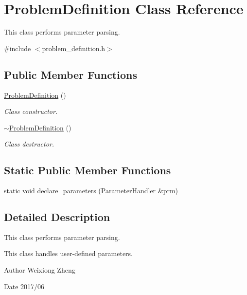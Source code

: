 \hypertarget{class_problem_definition}{}\section{Problem\+Definition Class Reference}
\label{class_problem_definition}


This class performs parameter parsing.  




{\ttfamily \#include $<$problem\+\_\+definition.\+h$>$}

\subsection*{Public Member Functions}
\begin{DoxyCompactItemize}
\item 
\hyperlink{class_problem_definition_ad5d05724dd7de8e362f0c8db129744f9}{Problem\+Definition} ()
\begin{DoxyCompactList}\small\item\em Class constructor. \end{DoxyCompactList}\item 
\hyperlink{class_problem_definition_a6aa61be43188cf28040bd0e7d2bf02e3}{$\sim$\+Problem\+Definition} ()
\begin{DoxyCompactList}\small\item\em Class destructor. \end{DoxyCompactList}\end{DoxyCompactItemize}
\subsection*{Static Public Member Functions}
\begin{DoxyCompactItemize}
\item 
static void \hyperlink{class_problem_definition_a0a68b3c08b69729642dcfd37f23e7494}{declare\+\_\+parameters} (Parameter\+Handler \&prm)
\end{DoxyCompactItemize}


\subsection{Detailed Description}
This class performs parameter parsing. 

This class handles user-\/defined parameters.

\begin{DoxyAuthor}{Author}
Weixiong Zheng 
\end{DoxyAuthor}
\begin{DoxyDate}{Date}
2017/06 
\end{DoxyDate}


